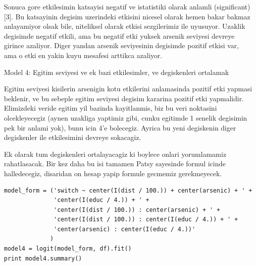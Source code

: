\documentclass[12pt,fleqn]{article}\usepackage{../common}
\begin{document}
Sonuca gore etkilesimin katsayisi negatif ve istatistiki olarak
anlamli (significant) [3]. Bu katsayinin degisim uzerindeki etkisini
nicesel olarak hemen bakar bakmaz anlayamiyor olsak bile, niteliksel
olarak etkisi sezgilerimiz ile uyusuyor. Uzaklik degisimde negatif etkili,
ama bu negatif etki yuksek arsenik seviyesi devreye girince azaliyor.
Diger yandan arsenik seviyesinin degisimde pozitif etkisi var, ama o
etki en yakin kuyu mesafesi arttikca azaliyor. 

Model 4: Egitim seviyesi ve ek bazi etkilesimler, ve degiskenleri ortalamak

Egitim seviyesi kisilerin arsenigin kotu etkilerini anlamasinda
pozitif etki yapmasi beklenir, ve bu sebeple egitim seviyesi degisim
kararina pozitif etki yapmalidir. Elimizdeki veride egitim yil bazinda
kayitlanmis, biz bu veri noktasini olcekleyecegiz (aynen uzakliga
yaptimiz gibi, cunku egitimde 1 senelik degisimin pek bir anlami yok),
bunu icin 4'e bolecegiz. Ayrica bu yeni degiskenin diger degiskenler
ile etkilesimini devreye sokacagiz.

Ek olarak tum degiskenleri ortalayacagiz ki boylece onlari
yorumlamamiz rahatlasacak. Bir kez daha bu isi tamamen Patsy sayesinde
formul icinde halledecegiz, disaridan on hesap yapip formule gecmemiz
gerekmeyecek.

\begin{verbatim}
model_form = ('switch ~ center(I(dist / 100.)) + center(arsenic) + ' +
              'center(I(educ / 4.)) + ' +
              'center(I(dist / 100.)) : center(arsenic) + ' + 
              'center(I(dist / 100.)) : center(I(educ / 4.)) + ' + 
              'center(arsenic) : center(I(educ / 4.))'
             )
model4 = logit(model_form, df).fit()
print model4.summary()
\end{verbatim}
\end{document}
